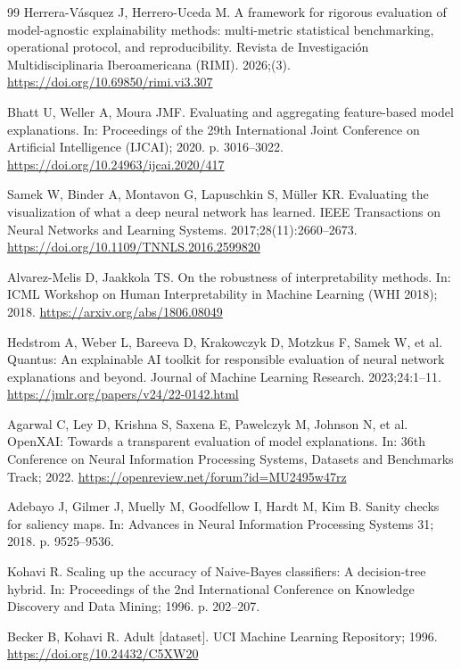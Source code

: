 \documentclass[11pt,a4paper]{article}
\begin{document}
\begin{thebibliography}{99}
Herrera-V\'asquez J, Herrero-Uceda M. A framework for rigorous evaluation of
model-agnostic explainability methods: multi-metric statistical benchmarking,
operational protocol, and reproducibility. Revista de Investigaci\'on
Multidisciplinaria Iberoamericana (RIMI). 2026;(3).
\url{https://doi.org/10.69850/rimi.vi3.307}

Bhatt U, Weller A, Moura JMF. Evaluating and aggregating feature-based model
explanations. In: Proceedings of the 29th International Joint Conference on
Artificial Intelligence (IJCAI); 2020. p. 3016--3022.
\url{https://doi.org/10.24963/ijcai.2020/417}

Samek W, Binder A, Montavon G, Lapuschkin S, M\"{u}ller KR. Evaluating the
visualization of what a deep neural network has learned. IEEE Transactions on
Neural Networks and Learning Systems. 2017;28(11):2660--2673.
\url{https://doi.org/10.1109/TNNLS.2016.2599820}

Alvarez-Melis D, Jaakkola TS. On the robustness of interpretability methods.
In: ICML Workshop on Human Interpretability in Machine Learning (WHI 2018);
2018. \url{https://arxiv.org/abs/1806.08049}

Hedstrom A, Weber L, Bareeva D, Krakowczyk D, Motzkus F, Samek W, et al.
Quantus: An explainable AI toolkit for responsible evaluation of neural
network explanations and beyond. Journal of Machine Learning Research.
2023;24:1--11. \url{https://jmlr.org/papers/v24/22-0142.html}

Agarwal C, Ley D, Krishna S, Saxena E, Pawelczyk M, Johnson N, et al.
OpenXAI: Towards a transparent evaluation of model explanations. In: 36th
Conference on Neural Information Processing Systems, Datasets and Benchmarks
Track; 2022. \url{https://openreview.net/forum?id=MU2495w47rz}

Adebayo J, Gilmer J, Muelly M, Goodfellow I, Hardt M, Kim B. Sanity checks
for saliency maps. In: Advances in Neural Information Processing Systems 31;
2018. p. 9525--9536.

Kohavi R. Scaling up the accuracy of Naive-Bayes classifiers: A
decision-tree hybrid. In: Proceedings of the 2nd International Conference on
Knowledge Discovery and Data Mining; 1996. p. 202--207.

Becker B, Kohavi R. Adult [dataset]. UCI Machine Learning Repository; 1996.
\url{https://doi.org/10.24432/C5XW20}


\end{thebibliography}
\end{document}
